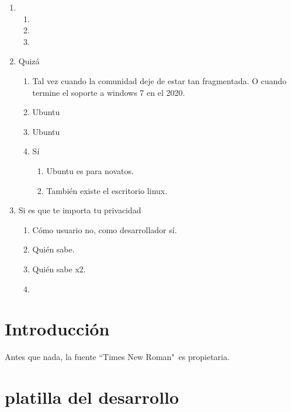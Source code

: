 \documentclass[12pt, twoside]{article}
\begin{document}
\begin{enumerate}
	\item
		\begin{enumerate}
			\item
			\item
			\item
		\end{enumerate}
	\item Quizá
		\begin{enumerate}
			\item Tal vez cuando la comunidad deje de estar tan fragmentada.
				O cuando termine el soporte a windows 7 en el 2020.
			\item Ubuntu
			\item Ubuntu
			\item Sí
				\begin{enumerate}
					\item Ubuntu es para novatos.
					\item También existe el escritorio linux.
				\end{enumerate}
		\end{enumerate}
	\item Si es que te importa tu privacidad
		\begin{enumerate}
			\item Cómo usuario no, como desarrollador sí.
			\item Quién sabe.
			\item Quién sabe x2.
			\item
		\end{enumerate}
\end{enumerate}

\fi
\section{Introducción}%
\label{sec:Introducción}

Antes que nada, la fuente ``Times New Roman"\ es propietaria. \citet{NEWROMAN}
%
\section{platilla del desarrollo}%
\end{document}
